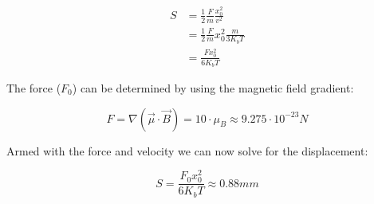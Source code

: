 \begin{answer}
  \begin{equation}
    \begin{split}
      S &= \frac 1 2 \frac F m \frac{x_0^2}{v^2} \\
      &= \frac 1 2 \frac F m x_0^2 \frac{m}{3K_bT} \\
      &= \frac{F x_0^2}{6K_bT}
    \end{split}
  \end{equation}

  The force ($F_0$) can be determined by using the magnetic field
  gradient:

  \begin{equation}
    F = \nabla(\vec{\mu} \cdot \vec{B}) = 10 \cdot \mu_B \approx 9.275\cdot 10^{-23} N
  \end{equation}

  Armed with the force and velocity we can now solve for
  the displacement:

  \begin{equation}
    S = \frac{F_0 x_0^2}{6K_bT} \approx 0.88mm
  \end{equation}
\end{answer}
